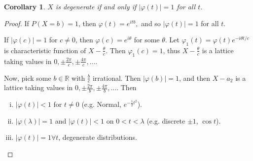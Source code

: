 \documentclass[10pt, oneside, reqno]{amsart}
\theoremstyle{plain}%
\newtheorem{cor}[thm]{Corollary}
\theoremstyle{definition}
\theoremstyle{remark}
\renewcommand{\phi}{\varphi}
\newcommand{\R}{\mathbb{R}}
\begin{document}
\begin{cor}
	$X$ is degenerate if and only if $| \phi(t) | = 1$ for all $t$. 
\end{cor}

\begin{proof}
	If $P(X = b) = 1$, then $\phi(t) = e^{itb},$ and so $| \phi(t) | = 1$ for all $t$.
	
	If $|\phi(c)| = 1$ for $ c \neq 0$, then $\phi(c) = e^{i\theta}$ for some $\theta$.  Let $\phi_1(t) = \phi(t) e^{-i \theta t/c}$ is characteristic function of $X - \frac{\theta}{c}$.  Then $\phi_1(c) = 1$, thus $X- \frac{\theta}{c}$ is a lattice taking values in $0, \pm \frac{2\pi}{c}, \pm \frac{4\pi}{c}, \dots$.  
	
	Now, pick some $b \in \R$ with $\frac{b}{c}$ irrational.  Then $|\phi(b) | = 1$, and then $X - a_2$ is a lattice taking values in $0, \pm \frac{2 \pi}{b}, \pm \frac{4 \pi}{b}, \dots$.  Then \begin{enumerate}[(i)]
		\item $|\phi(t)| < 1$ for $t \neq 0$ (e.g. Normal, $e^{-\frac{1}{2}t^2}$).
		\item $|\phi(\lambda) | = 1$ and $|\phi(t)| < 1$ on $0 < t < \lambda$ (e.g. discrete $\pm 1$, $\cos t$).
		\item $|\phi(t)| = 1 \forall t$, degenerate distributions.  
	\end{enumerate}
\end{proof}  
\end{document}
